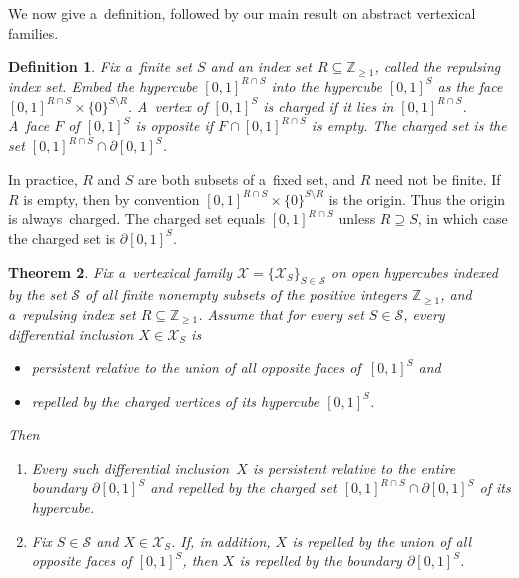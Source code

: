 \documentclass[pdftex]{sigma}
\newtheorem{Theorem}{Theorem}[section]
\newtheorem{Definition}[Theorem]{Definition}
\begin{document}
We now give a~def\/inition, followed by our main result on abstract vertexical families.
\begin{Definition}
\label{d:charged}
Fix a~f\/inite set $S$ and an index set $R\subseteq\mathbb{Z}_{\geq1}$, called the \emph{repulsing index set}.
Embed the hypercube $[0,1]^{R\cap S}$ into the hypercube $[0,1]^S$ as the face $[0,1]^{R\cap S}\times\{0\}^{S\setminus
R}$.
A~vertex of $[0,1]^S$ is \emph{charged} if it lies in $[0,1]^{R\cap S}$.
A~face $F$ of $[0,1]^S$ is \emph{opposite} if $F\cap[0,1]^{R\cap S}$ is empty.
The \emph{charged set} is the set $[0,1]^{R\cap S}\cap\partial[0,1]^S$.
\end{Definition}

In practice, $R$ and $S$ are both subsets of a~f\/ixed set, and $R$ need not be f\/inite.
If $R$ is empty, then by convention $[0,1]^{R\cap S}\times\{0\}^{S\setminus R}$ is the origin.
Thus the origin is always~charged.
The charged set equals $[0,1]^{R\cap S}$ unless $R\supseteq S$, in which case the charged set is $\partial[0,1]^S$.
\begin{Theorem}
\label{t:vertexical}
Fix a~vertexical family $\mathcal X=\{\mathcal X_S\}_{S\in\mathcal S}$ on open hypercubes indexed by the set $\mathcal
S$ of all finite nonempty subsets of the positive integers $\mathbb{Z}_{\geq1}$, and a~repulsing index set
$R\subseteq\mathbb{Z}_{\geq1}$.
Assume that for every set $S\in\mathcal S$, every differential inclusion $X\in\mathcal X_S$ is
\begin{itemize}\itemsep=-0.5pt
\item persistent relative to the union of all opposite faces of\/~$[0,1]^S$ and \item repelled by the charged vertices
of its hypercube $[0,1]^S$.
\end{itemize}
Then
\begin{enumerate}\itemsep=-0.5pt
\item[$1.$] Every such differential inclusion~$X$ is persistent relative to the entire boundary $\partial[0,1]^S$ and
repelled by the charged set $[0,1]^{R\cap S}\cap\partial[0,1]^S$ of its hypercube.
\item[$2.$] Fix $S\in\mathcal S$ and $X\in\mathcal X_S$.
If, in addition, $X$ is repelled by the union of all opposite faces of\/ $[0,1]^S$, then $X$ is repelled by the
boundary $\partial[0,1]^S$.
\end{enumerate}
\end{Theorem}
\end{document}
